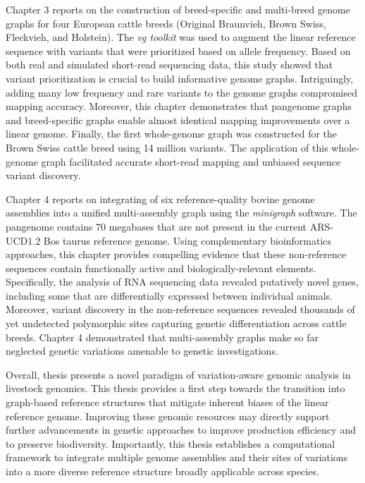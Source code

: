 \documentclass[11 pt, a4paper, notitlepage]{report}
\begin{document}
Chapter 3 reports on the construction of breed-specific and multi-breed genome graphs for four European cattle breeds (Original Braunvieh, Brown Swiss, Fleckvieh, and Holstein).  The \emph{vg toolkit} was used to augment the linear reference sequence with variants that were prioritized based on allele frequency. Based on both real and simulated short-read sequencing data, this study showed that variant prioritization is crucial to build informative genome graphs. Intriguingly, adding many low frequency and rare variants to the genome graphs compromised mapping accuracy. Moreover, this chapter demonstrates that pangenome graphs and breed-specific graphs enable almost identical mapping improvements over a linear genome. Finally, the first whole-genome graph was constructed for the Brown Swiss cattle breed using 14 million variants. The application of this whole-genome graph facilitated accurate short-read mapping and unbiased sequence variant discovery. 

\thispagestyle{plain}

Chapter 4 reports on integrating of six reference-quality bovine genome assemblies into a unified multi-assembly graph using the \emph{minigraph} software. The pangenome contains 70 megabases that are not present in the current ARS-UCD1.2 Bos taurus reference genome.  Using complementary bioinformatics approaches, this chapter provides compelling evidence that these non-reference sequences contain functionally active and biologically-relevant elements. Specifically, the analysis of RNA sequencing data revealed putatively novel genes, including some that are differentially expressed between individual animals. Moreover, variant discovery in the non-reference sequences revealed thousands of yet undetected polymorphic sites capturing genetic differentiation across cattle breeds. Chapter 4 demonstrated that multi-assembly graphs make so far neglected genetic variations amenable to genetic investigations. 

Overall, thesis presents a novel paradigm of variation-aware genomic analysis in livestock genomics. This thesis provides a first step towards the transition into graph-based reference structures that mitigate inherent biases of the linear reference genome. Improving these genomic resources may directly support further advancements in genetic approaches to improve production efficiency and to preserve biodiversity. Importantly, this thesis establishes a computational framework to integrate multiple genome assemblies and their sites of variations into a more diverse reference structure broadly applicable across species. 
\end{document}
